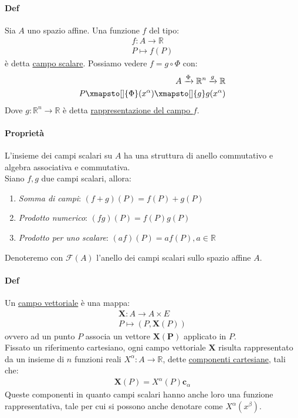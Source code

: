     \paragraph{Def} Sia $A$ uno spazio affine. Una funzione $f$ del tipo:
    \begin{align*}
        f:A\to \mathbb{R}\\
        P\mapsto f(P)
    \end{align*}
    è detta \underline{campo scalare}.
    Possiamo vedere $f=g\circ \Phi$ con:
    \begin{align*}
    A\xrightarrow[]{\Phi} \mathbb{R}^n\xrightarrow[]{g} \mathbb{R}\\P\xmapsto[]{\Phi}(x^\alpha)\xmapsto[]{g} g(x^\alpha)
    \end{align*}
    Dove $g\colon\mathbb{R}^n\to \mathbb{R}$ è detta \underline{rappresentazione del campo $f$}.
    \paragraph*{Proprietà} L'insieme dei campi scalari su $A$ ha una struttura di anello commutativo e algebra associativa e commutativa.\\
     Siano $f,g$ due campi scalari, allora:
    \begin{enumerate}
        \item \textit{Somma di campi}: $(f+g)(P)=f(P)+g(P)$
        \item \textit{Prodotto numerico}: $(fg)(P)=f(P)g(P)$
        \item \textit{Prodotto per uno scalare}: $(af)(P)=af(P), a \in \mathbb{R}$
    \end{enumerate}
    Denoteremo con $\mathcal{F}(A)$ l'anello dei campi scalari sullo spazio affine $A$.
    \paragraph*{Def} Un \underline{campo vettoriale} è una mappa:
    \begin{align*}
        \mathbf{X}\colon A \to A\times E\\
        P\mapsto (P,\mathbf{X}(P))
    \end{align*}
    ovvero ad un punto $P$ associa un vettore $\mathbf{X(P)}$ applicato in $P$.\\
    Fissato un riferimento cartesiano, ogni campo vettoriale $\mathbf{X}$ risulta rappresentato da un insieme di $n$ funzioni reali $X^\alpha\colon A \to \mathbb{R}$, dette \underline{componenti cartesiane}, tali che:
    \begin{align*}
        \mathbf{X}(P)=X^\alpha(P)\mathbf{c}_\alpha
    \end{align*}
    Queste componenti in quanto campi scalari hanno anche loro una funzione rappresentativa, tale per cui si possono anche denotare come $X^\alpha(x^{\beta})$.
